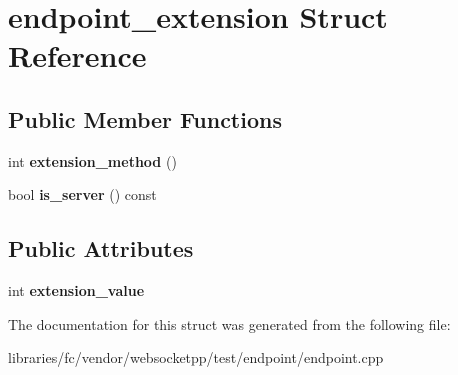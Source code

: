 \hypertarget{structendpoint__extension}{}\section{endpoint\+\_\+extension Struct Reference}
\label{structendpoint__extension}
\subsection*{Public Member Functions}
\begin{DoxyCompactItemize}
\item 
\mbox{\label{structendpoint__extension_a1428eb1d14f93752794f8e6cb3e8c46d}} 
int {\bfseries extension\+\_\+method} ()
\item 
\mbox{\label{structendpoint__extension_a751943a818e1d15ec30df4ddbd10f3b1}} 
bool {\bfseries is\+\_\+server} () const
\end{DoxyCompactItemize}
\subsection*{Public Attributes}
\begin{DoxyCompactItemize}
\item 
\mbox{\label{structendpoint__extension_a39666e526a376c0cba7f0ab9e6795c9f}} 
int {\bfseries extension\+\_\+value}
\end{DoxyCompactItemize}


The documentation for this struct was generated from the following file\+:\begin{DoxyCompactItemize}
\item 
libraries/fc/vendor/websocketpp/test/endpoint/endpoint.\+cpp\end{DoxyCompactItemize}
